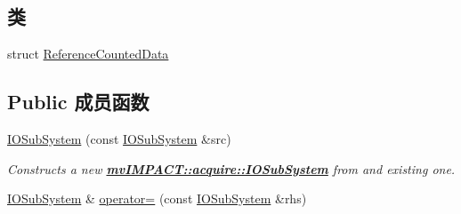 \subsection*{类}
\begin{DoxyCompactItemize}
\item 
struct \hyperlink{structmv_i_m_p_a_c_t_1_1acquire_1_1_i_o_sub_system_1_1_reference_counted_data}{Reference\+Counted\+Data}
\end{DoxyCompactItemize}
\subsection*{Public 成员函数}
\begin{DoxyCompactItemize}
\item 
\hyperlink{classmv_i_m_p_a_c_t_1_1acquire_1_1_i_o_sub_system_abe8360e07888561ed6a6c76a4eb84b6c}{I\+O\+Sub\+System} (const \hyperlink{classmv_i_m_p_a_c_t_1_1acquire_1_1_i_o_sub_system}{I\+O\+Sub\+System} \&src)
\begin{DoxyCompactList}\small\item\em Constructs a new {\bfseries \hyperlink{classmv_i_m_p_a_c_t_1_1acquire_1_1_i_o_sub_system}{mv\+I\+M\+P\+A\+C\+T\+::acquire\+::\+I\+O\+Sub\+System}} from and existing one. \end{DoxyCompactList}\item 
\hypertarget{classmv_i_m_p_a_c_t_1_1acquire_1_1_i_o_sub_system_ab6f2ba3019061e1f9beaeab18f866183}{\hyperlink{classmv_i_m_p_a_c_t_1_1acquire_1_1_i_o_sub_system}{I\+O\+Sub\+System} \& \hyperlink{classmv_i_m_p_a_c_t_1_1acquire_1_1_i_o_sub_system_ab6f2ba3019061e1f9beaeab18f866183}{operator=} (const \hyperlink{classmv_i_m_p_a_c_t_1_1acquire_1_1_i_o_sub_system}{I\+O\+Sub\+System} \&rhs)}\label{classmv_i_m_p_a_c_t_1_1acquire_1_1_i_o_sub_system_ab6f2ba3019061e1f9beaeab18f866183}


\end{DoxyCompactItemize}
